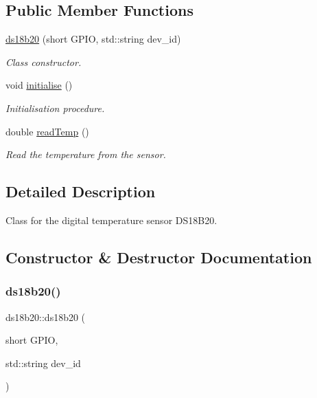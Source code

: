 \subsection*{Public Member Functions}
\begin{DoxyCompactItemize}
\item 
\mbox{\hyperlink{classds18b20_a2feec12ddec6572d29db8b0fe7181bab}{ds18b20}} (short G\+P\+IO, std\+::string dev\+\_\+id)
\begin{DoxyCompactList}\small\item\em Class constructor. \end{DoxyCompactList}\item 
void \mbox{\hyperlink{classds18b20_a222d770b98aa7c0d6ae27da9756c8979}{initialise}} ()
\begin{DoxyCompactList}\small\item\em Initialisation procedure. \end{DoxyCompactList}\item 
double \mbox{\hyperlink{classds18b20_a479caadfcbf4b1d0fd0867a440900e7d}{read\+Temp}} ()
\begin{DoxyCompactList}\small\item\em Read the temperature from the sensor. \end{DoxyCompactList}\end{DoxyCompactItemize}


\subsection{Detailed Description}
Class for the digital temperature sensor D\+S18\+B20. 



\subsection{Constructor \& Destructor Documentation}
\mbox{\label{classds18b20_a2feec12ddec6572d29db8b0fe7181bab}} 
\subsubsection{\texorpdfstring{ds18b20()}{ds18b20()}}
{\footnotesize\ttfamily ds18b20\+::ds18b20 (\begin{DoxyParamCaption}\item[{short}]{G\+P\+IO,  }\item[{std\+::string}]{dev\+\_\+id }\end{DoxyParamCaption})}




